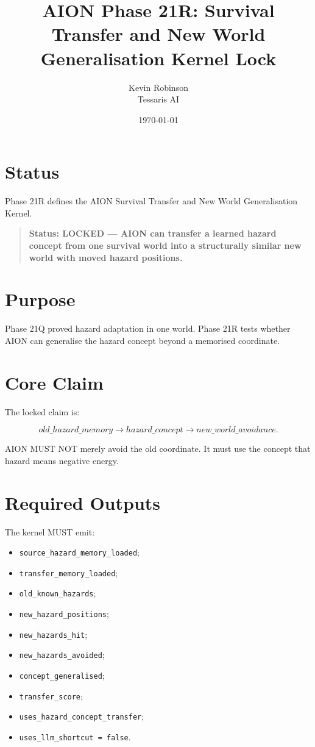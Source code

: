 \documentclass[11pt,a4paper]{article}
\title{\textbf{AION Phase 21R: Survival Transfer and New World Generalisation Kernel Lock}}
\author{Kevin Robinson\\Tessaris AI}
\date{\today}
\begin{document}
\maketitle

\section{Status}

Phase 21R defines the AION Survival Transfer and New World Generalisation Kernel.

\begin{quote}
\textbf{Status: LOCKED --- AION can transfer a learned hazard concept from one survival world into a structurally similar new world with moved hazard positions.}
\end{quote}

\section{Purpose}

Phase 21Q proved hazard adaptation in one world. Phase 21R tests whether AION can generalise the hazard concept beyond a memorised coordinate.

\section{Core Claim}

The locked claim is:

\[
old\_hazard\_memory \rightarrow hazard\_concept
\rightarrow new\_world\_avoidance.
\]

AION MUST NOT merely avoid the old coordinate. It must use the concept that hazard means negative energy.

\section{Required Outputs}

The kernel MUST emit:

\begin{itemize}
  \item \texttt{source\_hazard\_memory\_loaded};
  \item \texttt{transfer\_memory\_loaded};
  \item \texttt{old\_known\_hazards};
  \item \texttt{new\_hazard\_positions};
  \item \texttt{new\_hazards\_hit};
  \item \texttt{new\_hazards\_avoided};
  \item \texttt{concept\_generalised};
  \item \texttt{transfer\_score};
  \item \texttt{uses\_hazard\_concept\_transfer};
  \item \texttt{uses\_llm\_shortcut = false}.
\end{itemize}
\end{document}
